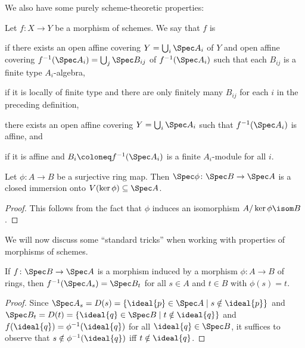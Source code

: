 \documentclass[wip, algebra]{bsteffan-lecturenotes}
\begin{document}
We also have some purely scheme-theoretic properties:
\begin{definition}
	Let $f\colon X \to Y$ be a morphism of schemes.
	We say that $f$ is\textellipsis{}
	\begin{alphanumerate}
		\item {} if there exists an open affine covering $Y = \bigcup_i \Spec A_i$ of $Y$ and open affine covering $f^{-1}(\Spec A_i) = \bigcup_j \Spec B_{ij}$ of $f^{-1}(\Spec A_i)$ such that each $B_{ij}$ is a finite type $A_i$-algebra,
		\item {} if it is locally of finite type and there are only finitely many $B_{ij}$ for each $i$ in the preceding definition,
		\item {} there exists an open affine covering $Y = \bigcup_i \Spec A_i$ such that $f^{-1}(\Spec A_i)$ is affine, and
		\item {} if it is affine and $B_i \coloneq f^{-1}(\Spec A_i)$ is a finite $A_i$-module for all $i$.
	\end{alphanumerate}
\end{definition}
\begin{proposition}\label{prp:sch:surjringmapclosedimm}
	Let $\phi\colon A \to B$ be a surjective ring map.
	Then $\Spec \phi\colon \Spec B \to \Spec A$ is a closed immersion onto $V(\ker \phi) \subseteq \Spec A$.
\end{proposition}
\begin{proof}
	This follows from the fact that $\phi$ induces an isomorphism $A / \ker \phi \isom B$.
\end{proof}
We will now discuss some \enquote{standard tricks} when working with properties of morphisms of schemes.
\begin{proposition}\label{prp:sch:basicloc}
	If $f\colon \Spec B \to \Spec A$ is a morphism induced by a morphism $\phi\colon A \to B$ of rings, then $f^{-1}(\Spec A_s) = \Spec B_t$ for all $s \in A$ and $t \in B$ with $\phi(s) = t$.
\end{proposition}
\begin{proof}
	Since $\Spec A_s = D(s) = \{\ideal{p} \in \Spec A \mid s \notin \ideal{p}\}$ and $\Spec B_t = D(t) = \{\ideal{q} \in \Spec B \mid t \notin \ideal{q}\}$ and $f(\ideal{q}) = \phi^{-1}(\ideal{q})$ for all $\ideal{q} \in \Spec B$, it suffices to observe that $s \notin \phi^{-1}(\ideal{q})$ iff $t \notin \ideal{q}$.
\end{proof}
\end{document}
